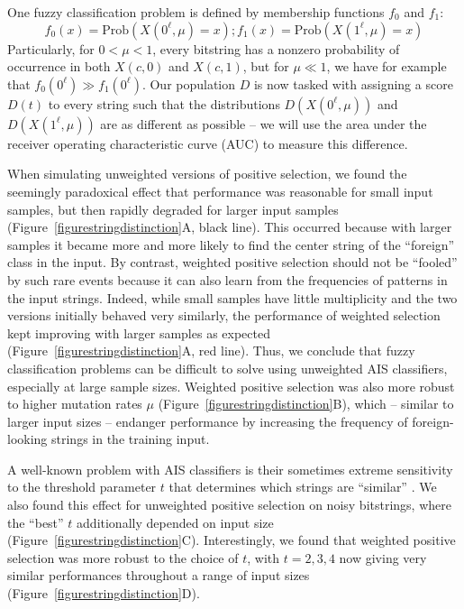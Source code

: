 \documentclass{llncs}
\newcommand{\text}[1]{\textrm{#1}}
\begin{document}
One fuzzy classification problem is defined by%
membership functions $f_0$ and $f_1$:
$$
f_0( x ) = \text{Prob}( X(0^\ell,\mu)=x ) ; f_1( x ) = \text{Prob}( X(1^\ell,\mu)=x ) 
$$
Particularly, for $0 < \mu < 1$, every bitstring has a nonzero 
probability of occurrence in both $X(c,0)$ and $X(c,1)$, but for $\mu \ll 1$, we
have for example that $f_0( 0^\ell ) \gg f_1( 0^\ell )$. Our population $D$ 
is now tasked  with assigning a score $D(t)$ to every string such that the 
distributions $D(X(0^\ell,\mu))$ and $D(X(1^\ell,\mu))$ are as different as 
possible -- we will use the area under the receiver operating characteristic
curve (AUC)  to measure this difference.





When simulating unweighted versions of positive selection, we found the seemingly paradoxical 
effect that performance was reasonable for small input samples, but then rapidly degraded for larger
input samples (Figure~\ref{figurestringdistinction}A, black line). This occurred because with larger samples it became more and more likely to find the 
center string of the ``foreign'' class in the input.
By contrast, weighted positive selection 
should not be ``fooled'' by such rare events because it can also learn from the frequencies of
patterns in the input strings. Indeed, while small
samples have little multiplicity and the two versions initially behaved very similarly, the performance
of weighted selection kept improving with larger samples as expected (Figure~\ref{figurestringdistinction}A, red line).
Thus, we conclude that fuzzy classification problems can be difficult to solve using
unweighted AIS classifiers, especially at large sample sizes.
Weighted positive selection was also more robust to higher mutation 
rates $\mu$ (Figure~\ref{figurestringdistinction}B), which -- similar to larger input 
sizes -- endanger performance by increasing the frequency of foreign-looking 
strings in the training input.

A well-known problem with AIS classifiers  is their sometimes extreme sensitivity to the 
threshold parameter $t$ that determines which strings are ``similar''
\cite{Dhaeseleer1996,Dhaeseleer1996b,Stibor2005,Wortel2020t}.
We also found this effect for 
unweighted positive selection on noisy bitstrings, where the ``best'' $t$ additionally
depended on input size (Figure~\ref{figurestringdistinction}C). Interestingly, we 
found that weighted positive selection was more robust to the choice of $t$, with 
$t = 2,3,4$ now giving very similar performances throughout a range of input sizes (Figure~\ref{figurestringdistinction}D).
\end{document}
